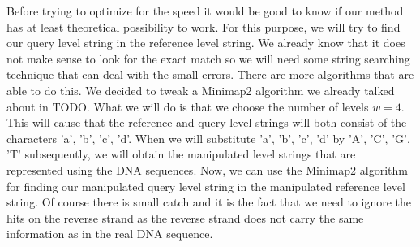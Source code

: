 Before trying to optimize for the speed it would be good to know if our method
has at least theoretical possibility to work. For this purpose, we will try to
find our query level string in the reference level string. We already know that
it does not make sense to look for the exact match so we will need some string searching
technique that can deal with the small errors. There are more algorithms that are able
to do this. We decided to tweak a Minimap2 \cite{li2018minimap2} algorithm we already
talked about in TODO. What we will do is that we choose the number of levels $w=4$.
This will cause that the reference and query level strings will both consist of
the characters 'a', 'b', 'c', 'd'. When we will substitute 'a', 'b', 'c', 'd' by
'A', 'C', 'G', 'T' subsequently, we will obtain the manipulated level strings that
are represented using the DNA sequences. Now, we can use the Minimap2 algorithm for
finding our manipulated query level string in the manipulated reference level string.
Of course there is small catch and it is the fact that we need to ignore the hits
on the reverse strand as the reverse strand does not carry the same information
as in the real DNA sequence.

